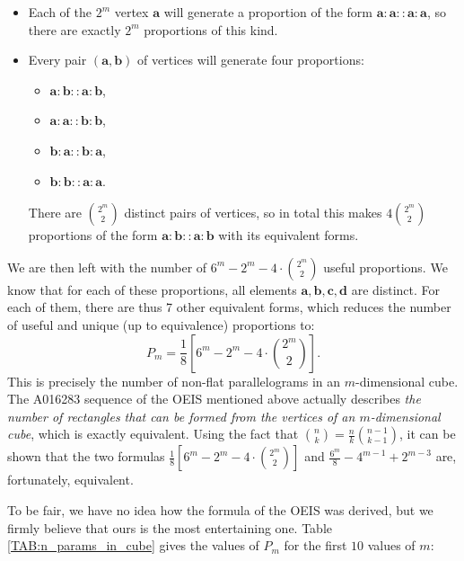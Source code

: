\begin{itemize}
  \item Each of the $2^m$ vertex $\mathbf{a}$ will generate a proportion of the
    form $\mathbf{a}: \mathbf{a} :: \mathbf{a} : \mathbf{a}$, so there are
    exactly $2^m$ proportions of this kind.
  \item Every pair $(\mathbf{a}, \mathbf{b})$ of vertices will generate four
    proportions:
    \begin{itemize}
      \item $\mathbf{a}: \mathbf{b} :: \mathbf{a} : \mathbf{b}$,
      \item $\mathbf{a}: \mathbf{a} :: \mathbf{b} : \mathbf{b}$,
      \item $\mathbf{b}: \mathbf{a} :: \mathbf{b} : \mathbf{a}$,
      \item $\mathbf{b}: \mathbf{b} :: \mathbf{a} : \mathbf{a}$.
    \end{itemize}
    There are $\binom{2^m}{2}$ distinct pairs of vertices, so in total this
    makes $4\binom{2^m}{2}$ proportions of the form $\mathbf{a}: \mathbf{b} ::
    \mathbf{a} : \mathbf{b}$ with its equivalent forms.
\end{itemize}

We are then left with the number of $6^m - 2^m - 4\cdot\binom{2^m}{2}$ useful
proportions. We know that for each of these proportions, all elements
$\mathbf{a}, \mathbf{b}, \mathbf{c}, \mathbf{d}$  are distinct. For each of
them, there are thus 7 other equivalent forms, which reduces the number of
useful and unique (up to equivalence) proportions to:
$$P_m = \frac{1}{8} \left[6^m - 2^m - 4\cdot\binom{2^m}{2} \right].$$
This is precisely the number of non-flat parallelograms in an $m$-dimensional
cube. The A016283 sequence of the OEIS mentioned above actually describes
\textit{the number of rectangles that can be formed from the vertices of an
$m$-dimensional cube}, which is exactly equivalent. Using
the fact that $\binom{n}{k} = \frac{n}{k}\binom{n - 1}{k - 1}$, it can be shown
that the two formulas $\frac{1}{8} \left[6^m - 2^m - 4\cdot\binom{2^m}{2} \right]$
and $\frac{6^m}{8} - 4^{m - 1} + 2^{m- 3}$ are, fortunately, equivalent.

To be fair, we have no idea how the formula of the OEIS was derived, but we
firmly believe that ours is the most entertaining one. Table
\ref{TAB:n_params_in_cube} gives the values of $P_m$ for the first $10$ values
of $m$:

